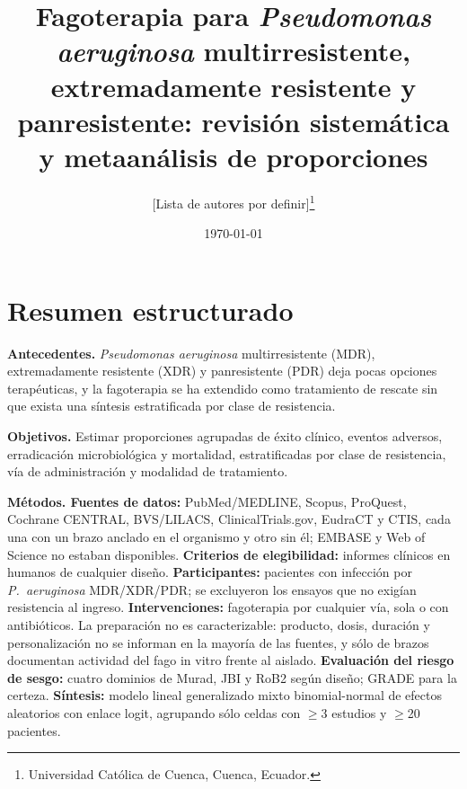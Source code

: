 \documentclass[12pt]{article}
\title{Fagoterapia para \textit{Pseudomonas aeruginosa} multirresistente, extremadamente resistente y panresistente: revisión sistemática y metaanálisis de proporciones}
\author{[Lista de autores por definir]\thanks{Universidad Cat\'olica de Cuenca, Cuenca, Ecuador.}}
\date{\today}
\begin{document}
\maketitle
\thispagestyle{empty}

\begin{center}
\end{center}

\vspace{1em}

\section*{Resumen estructurado}
\small

\textbf{Antecedentes.} \textit{Pseudomonas aeruginosa} multirresistente (MDR),
extremadamente resistente (XDR) y panresistente (PDR) deja pocas opciones
terapéuticas, y la fagoterapia se ha extendido como tratamiento de rescate sin
que exista una síntesis estratificada por clase de resistencia.

\textbf{Objetivos.} Estimar proporciones agrupadas de éxito clínico, eventos
adversos, erradicación microbiológica y mortalidad, estratificadas por clase de
resistencia, vía de administración y modalidad de tratamiento.

\textbf{Métodos. Fuentes de datos:} PubMed/MEDLINE, Scopus, ProQuest, Cochrane
CENTRAL, BVS/LILACS, ClinicalTrials.gov, EudraCT y CTIS, cada una con un brazo
anclado en el organismo y otro sin él; EMBASE y Web of Science no estaban
disponibles. \textbf{Criterios de elegibilidad:} informes clínicos en humanos de
cualquier diseño. \textbf{Participantes:} pacientes con infección por \textit{P.\
aeruginosa} MDR/XDR/PDR; se excluyeron los ensayos que no exigían resistencia al
ingreso. \textbf{Intervenciones:} fagoterapia por cualquier vía, sola o con
antibióticos. La preparación no es caracterizable: producto, dosis, duración y
personalización no se informan en la mayoría de las fuentes, y sólo
\PhageSuscDocumented de \PhageSuscArms brazos documentan actividad del fago in
vitro frente al aislado. \textbf{Evaluación del riesgo de sesgo:} cuatro
dominios de Murad, JBI y RoB2 según diseño; GRADE para la certeza.
\textbf{Síntesis:} modelo lineal generalizado mixto binomial-normal de efectos
aleatorios con enlace logit, agrupando sólo celdas con $\ge$3 estudios y $\ge$20
pacientes.
\end{document}
